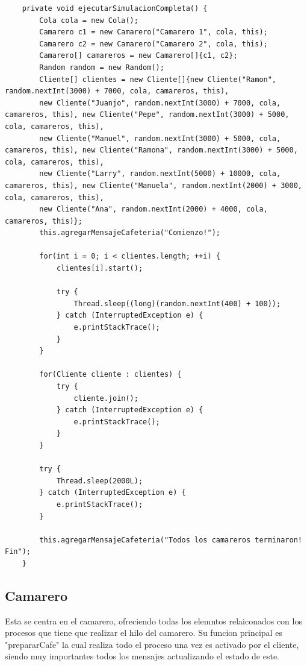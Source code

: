 \documentclass{article}
\begin{document}
\begin{lstlisting}
    private void ejecutarSimulacionCompleta() {
        Cola cola = new Cola();
        Camarero c1 = new Camarero("Camarero 1", cola, this);
        Camarero c2 = new Camarero("Camarero 2", cola, this);
        Camarero[] camareros = new Camarero[]{c1, c2};
        Random random = new Random();
        Cliente[] clientes = new Cliente[]{new Cliente("Ramon", random.nextInt(3000) + 7000, cola, camareros, this),
        new Cliente("Juanjo", random.nextInt(3000) + 7000, cola, camareros, this), new Cliente("Pepe", random.nextInt(3000) + 5000, cola, camareros, this),
        new Cliente("Manuel", random.nextInt(3000) + 5000, cola, camareros, this), new Cliente("Ramona", random.nextInt(3000) + 5000, cola, camareros, this),
        new Cliente("Larry", random.nextInt(5000) + 10000, cola, camareros, this), new Cliente("Manuela", random.nextInt(2000) + 3000, cola, camareros, this),
        new Cliente("Ana", random.nextInt(2000) + 4000, cola, camareros, this)};
        this.agregarMensajeCafeteria("Comienzo!");

        for(int i = 0; i < clientes.length; ++i) {
            clientes[i].start();

            try {
                Thread.sleep((long)(random.nextInt(400) + 100));
            } catch (InterruptedException e) {
                e.printStackTrace();
            }
        }

        for(Cliente cliente : clientes) {
            try {
                cliente.join();
            } catch (InterruptedException e) {
                e.printStackTrace();
            }
        }

        try {
            Thread.sleep(2000L);
        } catch (InterruptedException e) {
            e.printStackTrace();
        }

        this.agregarMensajeCafeteria("Todos los camareros terminaron! Fin");
    }
\end{lstlisting}

\subsection{Camarero}
Esta se centra en el camarero, ofreciendo todas los elemntos relaiconados con los procesos que tiene que realizar el hilo del camarero.
Su funcion principal es "prepararCafe" la cual realiza todo el proceso una vez es activado por el cliente, siendo muy importantes todos los mensajes actualizando el estado de este.
\begin{lstlisting} 
\end{lstlisting}
\end{document}

